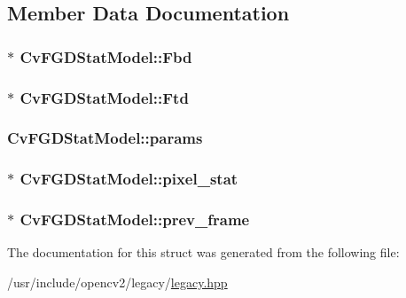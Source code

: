 \subsection{Member Data Documentation}
\hypertarget{structCvFGDStatModel_a29b2bf55e927fb67b65876cda6f1f200}{
\subsubsection[{Fbd}]{$\ast$ Cv\-F\-G\-D\-Stat\-Model\-::\-Fbd}}\label{structCvFGDStatModel_a29b2bf55e927fb67b65876cda6f1f200}
\hypertarget{structCvFGDStatModel_a802484fd8cbf4cd8415b3a96e96b1164}{
\subsubsection[{Ftd}]{$\ast$ Cv\-F\-G\-D\-Stat\-Model\-::\-Ftd}}\label{structCvFGDStatModel_a802484fd8cbf4cd8415b3a96e96b1164}
\hypertarget{structCvFGDStatModel_abd344f6b9f653ab49fde74d80cbce7aa}{
\subsubsection[{params}]{ Cv\-F\-G\-D\-Stat\-Model\-::params}}\label{structCvFGDStatModel_abd344f6b9f653ab49fde74d80cbce7aa}
\hypertarget{structCvFGDStatModel_a1a6802be9cad34649a3b06acf5294123}{
\subsubsection[{pixel\-\_\-stat}]{$\ast$ Cv\-F\-G\-D\-Stat\-Model\-::pixel\-\_\-stat}}\label{structCvFGDStatModel_a1a6802be9cad34649a3b06acf5294123}
\hypertarget{structCvFGDStatModel_a5408042c3fe0246dc047c215397a818f}{
\subsubsection[{prev\-\_\-frame}]{$\ast$ Cv\-F\-G\-D\-Stat\-Model\-::prev\-\_\-frame}}\label{structCvFGDStatModel_a5408042c3fe0246dc047c215397a818f}


The documentation for this struct was generated from the following file\-:\begin{DoxyCompactItemize}
\item 
/usr/include/opencv2/legacy/\hyperlink{legacy_8hpp}{legacy.\-hpp}\end{DoxyCompactItemize}
